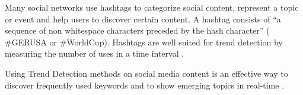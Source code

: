 Many social networks use hashtags to categorize social content, represent a topic or event and help users to discover certain content. A hashtag consists of \enquote{a sequence of non whitespace characters preceded by the hash character} \cites[644]{conf/wsdm/TsurR12}[1427]{conf/wsdm/TsurR12,conf/asunam/ZhangWL13} (\eg{} \#GERUSA or \#WorldCup). Hashtags are well suited for trend detection by measuring the number of uses in a time interval \cite[1427]{conf/asunam/ZhangWL13}.

Using Trend Detection methods on social media content is an effective way to discover frequently used keywords and to show emerging topics in real-time \cite{journals/smarthome/Kim+13,TwitterDataAnalytics2013}.